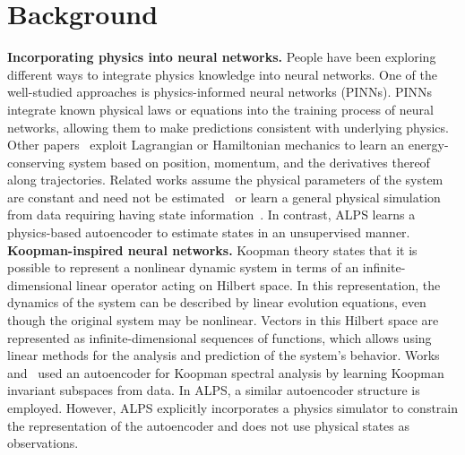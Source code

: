 \documentclass[acmtog]{techreportacmart}
\begin{document}
\section{Background} %
\textbf{Incorporating physics into neural networks.}
People have been exploring different ways to integrate physics knowledge into neural networks. One of the well-studied approaches is physics-informed neural networks (PINNs). PINNs integrate known physical laws or equations into the training process of neural networks, allowing them to make predictions consistent with underlying physics. Other papers~\cite{cranmer2020lagrangian} exploit Lagrangian or Hamiltonian mechanics to learn an energy-conserving system based on position, momentum, and the derivatives thereof along trajectories. Related works assume the physical parameters of the system are constant and need not be estimated~\cite{gupta2019general} or learn a general physical simulation from data requiring having state information~\cite{sanchez2020learning}. In contrast, ALPS learns a physics-based autoencoder to estimate states in an unsupervised manner.
\\
\textbf{Koopman-inspired neural networks.} Koopman theory states that it is possible to represent a nonlinear dynamic system in terms of an infinite-dimensional linear operator acting on Hilbert space. In this representation, the dynamics of the system can be described by linear evolution equations, even though the original system may be nonlinear. Vectors in this Hilbert space are represented as infinite-dimensional sequences of functions, which allows using linear methods for the analysis and prediction of the system's behavior. Works~\cite{takeishi2017learning} and~\cite{otto2019linearly} used an autoencoder for Koopman spectral analysis by learning Koopman invariant subspaces from data. In ALPS, a similar autoencoder structure is employed. However, ALPS explicitly incorporates a physics simulator to constrain the representation of the autoencoder and does not use physical states as observations.
\end{document}
